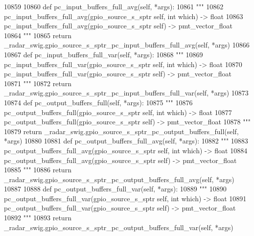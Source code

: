 \begin{DoxyCode}
{{{{{{{{{{{{{{{{{{{{{{{{{{{{{{{{{{10859 
10860     \textcolor{keyword}{def }pc_input_buffers_full_avg(self, *args):
10861         \textcolor{stringliteral}{"""}
10862 \textcolor{stringliteral}{        pc\_input\_buffers\_full\_avg(gpio\_source\_s\_sptr self, int which) -> float}
10863 \textcolor{stringliteral}{        pc\_input\_buffers\_full\_avg(gpio\_source\_s\_sptr self) -> pmt\_vector\_float}
10864 \textcolor{stringliteral}{        """}
10865         \textcolor{keywordflow}{return} \_radar\_swig.gpio\_source\_s\_sptr\_pc\_input\_buffers\_full\_avg(self, *args)
10866 
10867     \textcolor{keyword}{def }pc_input_buffers_full_var(self, *args):
10868         \textcolor{stringliteral}{"""}
10869 \textcolor{stringliteral}{        pc\_input\_buffers\_full\_var(gpio\_source\_s\_sptr self, int which) -> float}
10870 \textcolor{stringliteral}{        pc\_input\_buffers\_full\_var(gpio\_source\_s\_sptr self) -> pmt\_vector\_float}
10871 \textcolor{stringliteral}{        """}
10872         \textcolor{keywordflow}{return} \_radar\_swig.gpio\_source\_s\_sptr\_pc\_input\_buffers\_full\_var(self, *args)
10873 
10874     \textcolor{keyword}{def }pc_output_buffers_full(self, *args):
10875         \textcolor{stringliteral}{"""}
10876 \textcolor{stringliteral}{        pc\_output\_buffers\_full(gpio\_source\_s\_sptr self, int which) -> float}
10877 \textcolor{stringliteral}{        pc\_output\_buffers\_full(gpio\_source\_s\_sptr self) -> pmt\_vector\_float}
10878 \textcolor{stringliteral}{        """}
10879         \textcolor{keywordflow}{return} \_radar\_swig.gpio\_source\_s\_sptr\_pc\_output\_buffers\_full(self, *args)
10880 
10881     \textcolor{keyword}{def }pc_output_buffers_full_avg(self, *args):
10882         \textcolor{stringliteral}{"""}
10883 \textcolor{stringliteral}{        pc\_output\_buffers\_full\_avg(gpio\_source\_s\_sptr self, int which) -> float}
10884 \textcolor{stringliteral}{        pc\_output\_buffers\_full\_avg(gpio\_source\_s\_sptr self) -> pmt\_vector\_float}
10885 \textcolor{stringliteral}{        """}
10886         \textcolor{keywordflow}{return} \_radar\_swig.gpio\_source\_s\_sptr\_pc\_output\_buffers\_full\_avg(self, *args)
10887 
10888     \textcolor{keyword}{def }pc_output_buffers_full_var(self, *args):
10889         \textcolor{stringliteral}{"""}
10890 \textcolor{stringliteral}{        pc\_output\_buffers\_full\_var(gpio\_source\_s\_sptr self, int which) -> float}
10891 \textcolor{stringliteral}{        pc\_output\_buffers\_full\_var(gpio\_source\_s\_sptr self) -> pmt\_vector\_float}
10892 \textcolor{stringliteral}{        """}
10893         \textcolor{keywordflow}{return} \_radar\_swig.gpio\_source\_s\_sptr\_pc\_output\_buffers\_full\_var(self, *args)
}}}}}}}}}}}}}}}}}}}}}}}}}}}}}}}}}}
\end{DoxyCode}
